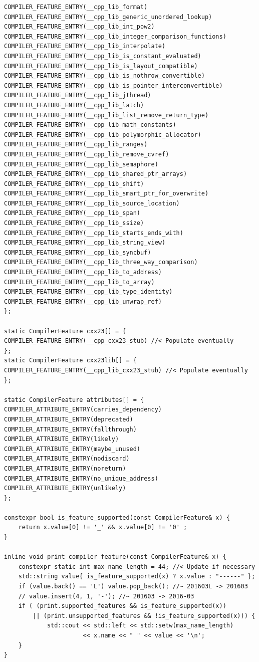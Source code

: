 \begin{lstlisting}[style=styleCXX]
COMPILER_FEATURE_ENTRY(__cpp_lib_format)
COMPILER_FEATURE_ENTRY(__cpp_lib_generic_unordered_lookup)
COMPILER_FEATURE_ENTRY(__cpp_lib_int_pow2)
COMPILER_FEATURE_ENTRY(__cpp_lib_integer_comparison_functions)
COMPILER_FEATURE_ENTRY(__cpp_lib_interpolate)
COMPILER_FEATURE_ENTRY(__cpp_lib_is_constant_evaluated)
COMPILER_FEATURE_ENTRY(__cpp_lib_is_layout_compatible)
COMPILER_FEATURE_ENTRY(__cpp_lib_is_nothrow_convertible)
COMPILER_FEATURE_ENTRY(__cpp_lib_is_pointer_interconvertible)
COMPILER_FEATURE_ENTRY(__cpp_lib_jthread)
COMPILER_FEATURE_ENTRY(__cpp_lib_latch)
COMPILER_FEATURE_ENTRY(__cpp_lib_list_remove_return_type)
COMPILER_FEATURE_ENTRY(__cpp_lib_math_constants)
COMPILER_FEATURE_ENTRY(__cpp_lib_polymorphic_allocator)
COMPILER_FEATURE_ENTRY(__cpp_lib_ranges)
COMPILER_FEATURE_ENTRY(__cpp_lib_remove_cvref)
COMPILER_FEATURE_ENTRY(__cpp_lib_semaphore)
COMPILER_FEATURE_ENTRY(__cpp_lib_shared_ptr_arrays)
COMPILER_FEATURE_ENTRY(__cpp_lib_shift)
COMPILER_FEATURE_ENTRY(__cpp_lib_smart_ptr_for_overwrite)
COMPILER_FEATURE_ENTRY(__cpp_lib_source_location)
COMPILER_FEATURE_ENTRY(__cpp_lib_span)
COMPILER_FEATURE_ENTRY(__cpp_lib_ssize)
COMPILER_FEATURE_ENTRY(__cpp_lib_starts_ends_with)
COMPILER_FEATURE_ENTRY(__cpp_lib_string_view)
COMPILER_FEATURE_ENTRY(__cpp_lib_syncbuf)
COMPILER_FEATURE_ENTRY(__cpp_lib_three_way_comparison)
COMPILER_FEATURE_ENTRY(__cpp_lib_to_address)
COMPILER_FEATURE_ENTRY(__cpp_lib_to_array)
COMPILER_FEATURE_ENTRY(__cpp_lib_type_identity)
COMPILER_FEATURE_ENTRY(__cpp_lib_unwrap_ref)
};

static CompilerFeature cxx23[] = {
COMPILER_FEATURE_ENTRY(__cpp_cxx23_stub) //< Populate eventually
};
static CompilerFeature cxx23lib[] = {
COMPILER_FEATURE_ENTRY(__cpp_lib_cxx23_stub) //< Populate eventually
};

static CompilerFeature attributes[] = {
COMPILER_ATTRIBUTE_ENTRY(carries_dependency)
COMPILER_ATTRIBUTE_ENTRY(deprecated)
COMPILER_ATTRIBUTE_ENTRY(fallthrough)
COMPILER_ATTRIBUTE_ENTRY(likely)
COMPILER_ATTRIBUTE_ENTRY(maybe_unused)
COMPILER_ATTRIBUTE_ENTRY(nodiscard)
COMPILER_ATTRIBUTE_ENTRY(noreturn)
COMPILER_ATTRIBUTE_ENTRY(no_unique_address)
COMPILER_ATTRIBUTE_ENTRY(unlikely)
};

constexpr bool is_feature_supported(const CompilerFeature& x) {
	return x.value[0] != '_' && x.value[0] != '0' ;
}

inline void print_compiler_feature(const CompilerFeature& x) {
	constexpr static int max_name_length = 44; //< Update if necessary
	std::string value{ is_feature_supported(x) ? x.value : "------" };
	if (value.back() == 'L') value.pop_back(); //~ 201603L -> 201603
	// value.insert(4, 1, '-'); //~ 201603 -> 2016-03
	if ( (print.supported_features && is_feature_supported(x))
		|| (print.unsupported_features && !is_feature_supported(x))) {
			std::cout << std::left << std::setw(max_name_length)
					  << x.name << " " << value << '\n';
	}
}


\end{lstlisting}
